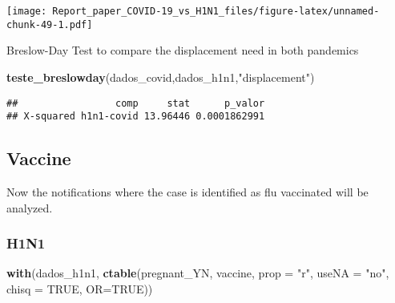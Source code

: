 \documentclass[
]{article}
\newenvironment{Shaded}{\begin{snugshade}}{\end{snugshade}}
\newcommand{\CommentTok}[1]{\textcolor[rgb]{0.56,0.35,0.01}{\textit{#1}}}
\newcommand{\DataTypeTok}[1]{\textcolor[rgb]{0.13,0.29,0.53}{#1}}
\newcommand{\DecValTok}[1]{\textcolor[rgb]{0.00,0.00,0.81}{#1}}
\newcommand{\KeywordTok}[1]{\textcolor[rgb]{0.13,0.29,0.53}{\textbf{#1}}}
\newcommand{\NormalTok}[1]{#1}
\newcommand{\OperatorTok}[1]{\textcolor[rgb]{0.81,0.36,0.00}{\textbf{#1}}}
\newcommand{\OtherTok}[1]{\textcolor[rgb]{0.56,0.35,0.01}{#1}}
\newcommand{\StringTok}[1]{\textcolor[rgb]{0.31,0.60,0.02}{#1}}
\begin{document}
\texttt{[image: Report\_paper\_COVID-19\_vs\_H1N1\_files/figure-latex/unnamed-chunk-49-1.pdf]}

Breslow-Day Test to compare the displacement need in both pandemics

\begin{Shaded}
\begin{Highlighting}[]
\KeywordTok{teste_breslowday}\NormalTok{(dados_covid,dados_h1n1,}\StringTok{"displacement"}\NormalTok{)}
\end{Highlighting}
\end{Shaded}

\begin{verbatim}
##                 comp     stat      p_valor
## X-squared h1n1-covid 13.96446 0.0001862991
\end{verbatim}

\hypertarget{vaccine}{%
\subsection{Vaccine}\label{vaccine}}

Now the notifications where the case is identified as flu vaccinated
will be analyzed.

\hypertarget{h1n1-4}{%
\subsubsection{H1N1}\label{h1n1-4}}

\begin{Shaded}
\end{Shaded}

\begin{Shaded}
\begin{Highlighting}[]
\KeywordTok{with}\NormalTok{(dados_h1n1, }\KeywordTok{ctable}\NormalTok{(pregnant_YN, vaccine, }\DataTypeTok{prop =} \StringTok{"r"}\NormalTok{, }\DataTypeTok{useNA =} \StringTok{"no"}\NormalTok{, }\DataTypeTok{chisq =} \OtherTok{TRUE}\NormalTok{, }\DataTypeTok{OR=}\OtherTok{TRUE}\NormalTok{))}
\end{Highlighting}
\end{Shaded}
\end{document}
